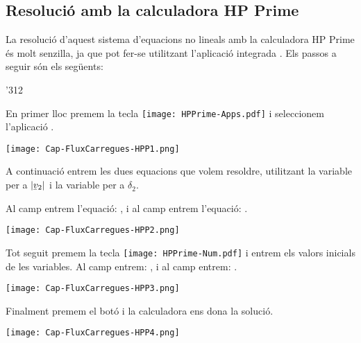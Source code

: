 \hspace{1cm}

\hspace{1cm}

\hspace{1cm}

\subsection{Resolució amb la calculadora \textsf{HP Prime}}

La resolució d'aquest sistema d'equacions no lineals amb la calculadora \textsf{HP Prime} és molt senzilla, ja que pot fer-se utilitzant l'aplicació integrada . Els passos a seguir són els següents:

\begin{dingautolist}{'312}

    \item En primer lloc premem la tecla \texttt{[image: HPPrime-Apps.pdf]} i seleccionem l'aplicació .

         \texttt{[image: Cap-FluxCarregues-HPP1.png]}

    \item A continuació entrem les dues equacions que volem resoldre, utilitzant la variable  per a $|\cmplx{v}_2|$ i la variable  per a $\delta_2$.

        Al camp  entrem l'equació: , i al camp  entrem l'equació: .

        \texttt{[image: Cap-FluxCarregues-HPP2.png]}

    \item Tot seguit premem la tecla \texttt{[image: HPPrime-Num.pdf]} i entrem els valors inicials de les variables. Al camp  entrem: , i al camp  entrem: .

        \texttt{[image: Cap-FluxCarregues-HPP3.png]}

    \item  Finalment premem el botó  i la calculadora ens dona  la solució.

        \texttt{[image: Cap-FluxCarregues-HPP4.png]}

\end{dingautolist}
